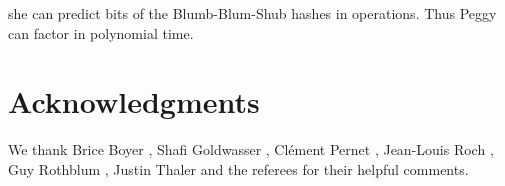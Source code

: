 \documentclass{article}
\newcommand{\balancecolumns}{}
\begin{document}
she can predict  bits of the Blumb-Blum-Shub hashes in
 operations. 
Thus Peggy can factor  in polynomial time.

 
 
 
 
 

 
 
 
 
 
 
 

 
 
 
 

 
 
 
 
 
 

 
 

 
\section*{Acknowledgments} 
We thank Brice Boyer 
, Shafi Goldwasser 
, Cl\'ement Pernet 
, Jean-Louis Roch 
, Guy Rothblum 
, Justin Thaler  
and the referees  
for their helpful comments.   

 
 
  

\balancecolumns
\end{document}
